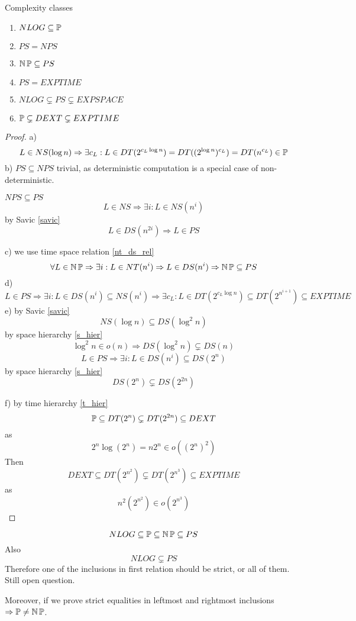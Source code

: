 \begin{exercise}
	Complexity classes
	\begin{enumerate}[label=\alph*)]
		\item $NLOG \subseteq \operatorname{\mathbb{P}}$
		\item $PS = NPS$
		\item $\operatorname{\operatorname{\mathbb{N}}\mathbb{P}} \subseteq PS$
		\item $PS = EXPTIME$
		\item $NLOG \subsetneq PS \subsetneq EXPSPACE$
		\item $\operatorname{\mathbb{P}} \subsetneq DEXT \subsetneq EXPTIME$
	\end{enumerate}

\end{exercise}
\begin{proof}
	a)
	\[ L \in NS(\log n) \Rightarrow \exists c_L: L \in DT(2^{c_L \log n}) = DT((2^{\log n})^{c_L}) = DT(n^{c_L}) \in \operatorname{\mathbb{P}} \]
	b) $PS \subseteq NPS$ trivial, as deterministic computation is a special case of non-deterministic.

	$NPS \subseteq PS$
	\[ L \in NS \Rightarrow \exists i: L \in NS(n^i) \]
	by Savic \cref{savic}
	\[ L \in DS(n^{2i}) \Rightarrow L \in PS \]

	c) we use time space relation \cref{nt_ds_rel}
	\[ \forall L \in \operatorname{\operatorname{\mathbb{N}}\mathbb{P}} \Rightarrow \exists i: L \in NT(n^i) \Rightarrow L \in DS(n^i) \Rightarrow \operatorname{\operatorname{\mathbb{N}}\mathbb{P}} \subseteq PS \]
	d)
	\[ L \in PS \Rightarrow \exists i: L \in DS(n^i) \subseteq NS(n^i) \Rightarrow \exists c_L: L \in DT(2^{c_L \log n}) \subseteq DT(2^{n^{i + 1}}) \subseteq EXPTIME \]
	e) by Savic \cref{savic}
	\[ NS(\log n) \subseteq DS(\log^2 n) \]
	by space hierarchy \cref{s_hier}
	\[ \log^2 n \in o(n) \Rightarrow DS(\log^2 n) \subsetneq DS(n) \]
	\[ L \in PS \Rightarrow \exists i: L \in DS(n^i) \subseteq DS(2^n) \]
	by space hierarchy \cref{s_hier}
	\[ DS(2^n) \subsetneq DS(2^{2n}) \]

	f)
	by time hierarchy \cref{t_hier}
	\[ \operatorname{\mathbb{P}} \subseteq DT(2^n) \subsetneq DT(2^{2n}) \subseteq DEXT \]
	as
	\[ 2^n \log(2^n) = n 2^n \in o((2^n)^2) \]
	Then
	\[ DEXT \subseteq DT(2^{n^2}) \subsetneq DT(2^{n^3}) \subseteq EXPTIME \]
	as
	\[ n^2 (2^{n^2}) \in o (2^{n^3}) \]
\end{proof}

\begin{note}
	\[ NLOG \subseteq \operatorname{\mathbb{P}} \subseteq \operatorname{\operatorname{\mathbb{N}}\mathbb{P}} \subseteq PS \]
	Also
	\[ NLOG \subsetneq PS \]
	Therefore one of the inclusions in first relation should be strict, or all of them. Still open question.

	Moreover, if we prove strict equalities in leftmost and rightmost inclusions $\Rightarrow \operatorname{\mathbb{P}} \neq \operatorname{\operatorname{\mathbb{N}}\mathbb{P}}$.
\end{note}

